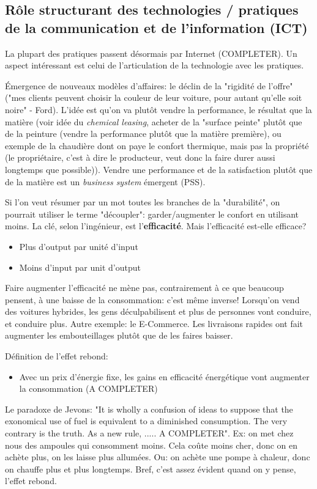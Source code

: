 \documentclass{article}
\begin{document}
\subsection{Rôle structurant des technologies / pratiques de la communication et de l'information (ICT)}
 La plupart des pratiques passent désormais par Internet (COMPLETER). Un aspect intéressant est celui de l'articulation de la technologie avec les pratiques. \par
 Émergence de nouveaux modèles d'affaires: le déclin de la "rigidité de l'offre" ("mes clients peuvent choisir la couleur de leur voiture, pour autant qu'elle soit noire" - Ford). L'idée est qu'on va plutôt vendre la performance, le résultat que la matière (voir idée du \emph{chemical leasing}, acheter de la "surface peinte" plutôt que de la peinture (vendre la performance plutôt que la matière première), ou exemple de la chaudière dont on paye le confort thermique, mais pas la propriété (le propriétaire, c'est à dire le producteur, veut donc la faire durer aussi longtemps que possible)). Vendre une performance et de la satisfaction plutôt que de la matière est un \emph{business system} émergent (PSS). \par
 Si l'on veut résumer par un mot toutes les branches de la "durabilité", on pourrait utiliser le terme "découpler": garder/augmenter le confort en utilisant moins. La clé, selon l'ingénieur, est l'\textbf{efficacité}. Mais l'efficacité est-elle efficace?
 \begin{itemize}
 	\item Plus d'output par unité d'input
 	\item Moins d'input par unit d'output
 \end{itemize}
 Faire augmenter l'efficacité ne mène pas, contrairement à ce que beaucoup pensent, à une baisse de la consommation: c'est même inverse! Lorsqu'on vend des voitures hybrides, les gens déculpabilisent et plus de personnes vont conduire, et conduire plus. Autre exemple: le E-Commerce. Les livraisons rapides ont fait augmenter les embouteillages plutôt que de les faires baisser. \par
 Définition de l'effet rebond:
 \begin{itemize}
 	\item Avec un prix d'énergie fixe, les gains en efficacité énergétique vont augmenter la consommation (A COMPLETER)
 \end{itemize}
 Le paradoxe de Jevons: "It is wholly a confusion of ideas to suppose that the exonomical use of fuel is equivalent to a diminished consumption. The very contrary is the truth. As a new rule, ..... A COMPLETER". Ex: on met chez nous des ampoules qui consomment moins. Cela coûte moins cher, donc on en achète plus, on les laisse plus allumées. Ou: on achète une pompe à chaleur, donc on chauffe plus et plus longtemps. Bref, c'est assez évident quand on y pense, l'effet rebond. \par
\end{document}
